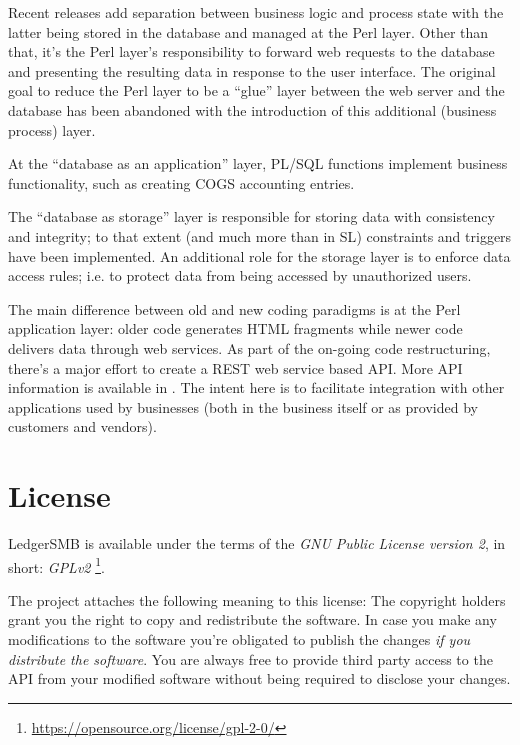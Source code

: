Recent releases add separation between business logic and process state with the
latter being stored in the database and managed at the Perl layer.  Other than that, it's the Perl layer's responsibility to forward web requests to the database and
presenting the resulting data in response to the user interface.
The original goal to reduce the Perl layer to be a ``glue'' layer between the web
server and the database has been abandoned with  the introduction of this additional
(business process) layer.

At the ``database as an application'' layer, \gls{PL/SQL} functions implement business
functionality, such as creating \gls{COGS} accounting entries.

The ``database as storage'' layer is responsible for storing data with consistency and
integrity; to that extent (and much more than in \acrshort{SL}) constraints and triggers
have been implemented.  An additional role for the storage layer is to enforce data
access rules; i.e. to protect data from being accessed by unauthorized users.

The main difference between old and new coding paradigms is at the Perl application
layer: older code generates HTML fragments while newer code delivers data through
web services.  As part of the on-going code restructuring, there's a major effort
to create a \gls{REST} web service based \gls{API}.
More \gls{API} information is available in .
The intent here is to facilitate
integration with other applications used by businesses (both in the business itself
or as provided by customers and vendors).






\section{License}
\label{sec-ledgersmb-license}

LedgerSMB is available under the terms of the
\textit{GNU Public License version 2}, in short: \textit{GPLv2}
\footnote{\url{https://opensource.org/license/gpl-2-0/}}.

The project attaches the following meaning to this license:
The copyright holders grant you the right to copy and
redistribute the software.  In case you make any modifications to the software
you're obligated to publish the changes \textit{if you distribute the software}.  You are always free to provide third party access to
the \acrshort{API} from your modified software without being required to disclose your changes.

